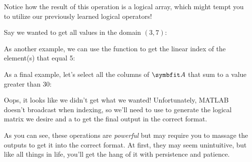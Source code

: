 \documentclass{article}
\begin{document}
Notice how the result of this operation is a logical array, which might
tempt you to utilize our previously learned logical operators!

Say we wanted to get all values in the domain \((3, 7)\):


As another example, we can use the  function to get the linear index of
the element(s) that equal 5:


As a final example, let's select all the columns of \(\mat{A}\) that
sum to a value greater than 30:


Oops, it looks like we didn't get what we wanted!  Unfortunately, MATLAB
doesn't broadcast when indexing, so we'll need to use  to generate
the logical matrix we desire and a  to get the final output in the
correct format.


As you can see, these operations are \emph{powerful} but may require you
to massage the outputs to get it into the correct format.  At first,
they may seem unintuitive, but like all things in life, you'll get the
hang of it with persistence and patience.
\end{document}
